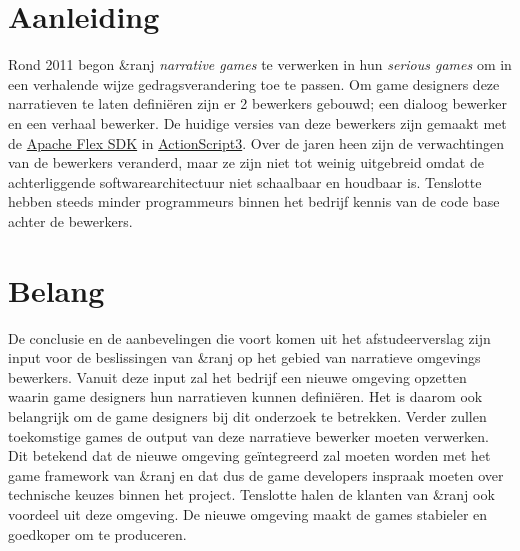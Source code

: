 \documentclass{report}
\newcommand{\organisation}{\&ranj }
\begin{document}
\section{Aanleiding}

Rond 2011 begon \organisation \emph{narrative games} te verwerken in hun \emph{serious games} om in een verhalende wijze gedragsverandering toe te passen. Om game designers deze narratieven te laten defini{\"e}ren zijn er 2 bewerkers gebouwd; een dialoog bewerker en een verhaal bewerker. De huidige versies van deze bewerkers zijn gemaakt met de \href{https://en.wikipedia.org/wiki/Apache_Flex}{Apache Flex SDK} in \href{http://www.adobe.com/devnet/actionscript/articles/actionscript3_overview.html}{ActionScript3}.
Over de jaren heen zijn de verwachtingen van de bewerkers veranderd, maar ze zijn niet tot weinig uitgebreid omdat de achterliggende softwarearchitectuur niet schaalbaar en houdbaar is. Tenslotte hebben steeds minder programmeurs binnen het bedrijf kennis van de code base achter de bewerkers.

\section{Belang}
De conclusie en de aanbevelingen die voort komen uit het afstudeerverslag zijn input voor de beslissingen van \organisation op het gebied van narratieve omgevings bewerkers. Vanuit deze input zal het bedrijf een nieuwe omgeving opzetten waarin game designers hun narratieven kunnen defini{\"e}ren. Het is daarom ook belangrijk om de game designers bij dit onderzoek te betrekken. Verder zullen toekomstige games de output van deze narratieve bewerker moeten verwerken. Dit betekend dat de nieuwe omgeving ge{\"i}ntegreerd zal moeten worden met het game framework van \organisation en dat dus de game developers inspraak moeten over technische keuzes binnen het project. Tenslotte halen de klanten van \organisation ook voordeel uit deze omgeving. De nieuwe omgeving maakt de games stabieler en goedkoper om te produceren.
\end{document}

